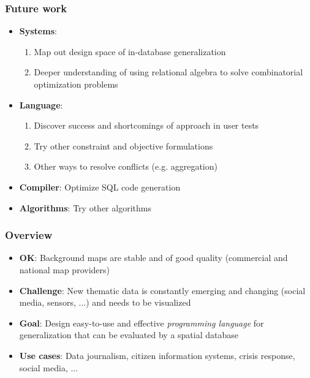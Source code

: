 \documentclass{beamer}
\begin{document}
\frame
{
  \frametitle{Future work}
  \begin{itemize}
  \item \textbf{Systems}: 
  \begin{enumerate}
    \item Map out design space of in-database generalization
    \item Deeper understanding of using relational algebra to solve combinatorial optimization problems
  \end{enumerate}
  \item \textbf{Language}: 
  \begin{enumerate}
  	\item Discover success and shortcomings of approach in user tests
  	\item Try other constraint and objective formulations
  	\item Other ways to resolve conflicts (e.g. aggregation)
  \end{enumerate}
  \item \textbf{Compiler}: Optimize SQL code generation
  \item \textbf{Algorithms}: Try other algorithms
  \end{itemize}
  \begin{center}
  \end{center}
}



\frame
{
  \frametitle{Overview}
  \begin{center}
  \end{center}
  
  \begin{itemize}
  \item \textbf{OK}: Background maps are stable and of good quality (commercial and national map providers)
  \item \textbf{Challenge}: New thematic data is constantly emerging and changing (social media, sensors, ...) and needs to be visualized
  \item \textbf{Goal}: Design easy-to-use and effective \emph{programming language} for generalization that can be evaluated by a spatial database  \item \textbf{Use cases}: Data journalism, citizen information systems, crisis response, social media, ...
  \end{itemize}
}
\end{document}
